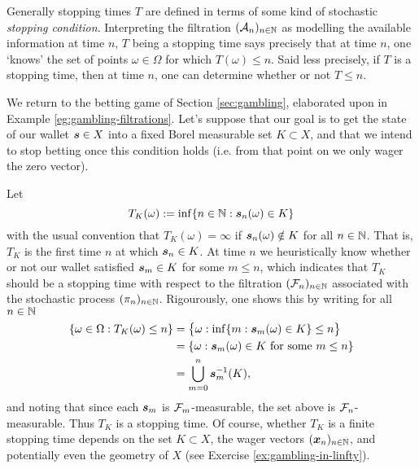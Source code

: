 Generally stopping times $T$ are defined in terms of some kind of stochastic \emph{stopping condition}.
Interpreting the filtration $(\mathcal{A}_n)_{n \in \mathbb{N}}$ as modelling the available information at time $n$, $T$ being a stopping time says precisely that at time $n$, one `knows' the set of points $\omega \in \Omega$ for which $T(\omega) \leq n$.
Said less precisely, if $T$ is a stopping time, then at time $n$, one can determine whether or not $T \leq n$.

\begin{example}\label{eg:gambling-stoppingtimes}
  We return to the betting game of Section \ref{sec:gambling}, elaborated upon in Example \ref{eg:gambling-filtrations}.
  Let's suppose that our goal is to get the state of our wallet $\bm{s} \in X$ into a fixed Borel measurable set $K \subset X$, and that we intend to stop betting once this condition holds (i.e. from that point on we only wager the zero vector).
  
  Let
  \begin{equation*}
    T_K(\omega) := \inf\{n \in \mathbb{N} : \bm{s}_n(\omega) \in K \}
  \end{equation*}
  with the usual convention that $T_K(\omega) = \infty$ if $\bm{s}_n(\omega) \notin K$ for all $n \in \mathbb{N}$.
  That is, $T_K$ is the first time $n$ at which $\bm{s}_n \in K$.
  At time $n$ we heuristically know whether or not our wallet satisfied $\bm{s}_m \in K$ for some $m \leq n$, which indicates that $T_K$ should be a stopping time with respect to the filtration $(\mathcal{F}_n)_{n \in \mathbb{N}}$ associated with the stochastic process $(\pi_n)_{n \in \mathbb{N}}$.
  Rigourously, one shows this by writing for all $n \in \mathbb{N}$
  \begin{equation*}
    \begin{aligned}
      \{\omega \in \Omega : T_K(\omega) \leq n\}
      &= \big\{\omega : \inf\{m : \bm{s}_m(\omega) \in K\} \leq n\big\} \\
      &= \{\omega  : \text{$\bm{s}_m(\omega) \in K$ for some $m \leq n$}\} \\
      &= \bigcup_{m = 0}^n \bm{s}_m^{-1}(K),
    \end{aligned}
  \end{equation*}
  and noting that since each $\bm{s}_m$ is $\mathcal{F}_m$-measurable, the set above is $\mathcal{F}_n$-measurable.
  Thus $T_K$ is a stopping time.
  Of course, whether $T_K$ is a finite stopping time depends on the set $K \subset X$, the wager vectors $(\bm{x}_n)_{n \in \mathbb{N}}$, and potentially even the geometry of $X$ (see Exercise \ref{ex:gambling-in-linfty}).
\end{example}

